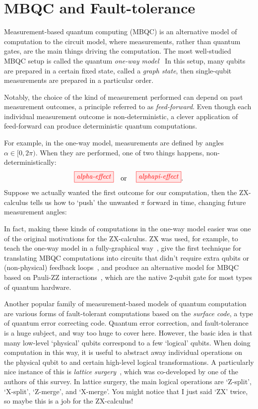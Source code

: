 \documentclass[11pt]{article}
\theoremstyle{definition}
\begin{document}
{\section{MBQC and Fault-tolerance}\label{sec:prac}%
     
Measurement-based quantum computing (MBQC) is an alternative model of computation to the circuit model, where measurements, rather than quantum gates, are the main things driving the computation. The most well-studied MBQC setup is called the quantum \textit{one-way model}~\cite{MBQC2} In this setup, many qubits are prepared in a certain fixed state, called a \textit{graph state}, then single-qubit measurements are prepared in a particular order.

Notably, the choice of the kind of measurement performed can depend on past measurement outcomes, a principle referred to as \textit{feed-forward}. Even though each individual measurement outcome is non-deterministic, a clever application of feed-forward can produce deterministic quantum computations.

For example, in the one-way model, measurements are defined by angles $\alpha \in [0, 2\pi)$. When they are performed, one of two things happens, non-deterministically:
\[ \tikzfig{alpha-effect} \textrm{\quad or \quad} \tikzfig{alphapi-effect}. \]
Suppose we actually wanted the first outcome for our computation, then the ZX-calculus tells us how to `push' the unwanted $\pi$ forward in time, changing future measurement angles:

In fact, making these kinds of computations in the one-way model easier was one of the original motivations for the ZX-calculus. ZX was used, for example, to teach the one-way model in a fully-graphical way~\cite{CKbook}, give the first technique for translating MBQC computations into circuits that didn't require extra qubits or (non-physical) feedback loops~\cite{DP2}, and produce an alternative model for MBQC based on Pauli-ZZ interactions~\cite{Kissinger2019universalmbqc}, which are the native 2-qubit gate for most types of quantum hardware.

Another popular family of measurement-based models of quantum computation are various forms of fault-tolerant computations based on the \textit{surface code}, a type of quantum error correcting code. Quantum error correction, and fault-tolerance is a huge subject, and way too huge to cover here. However, the basic idea is that many low-level `physical' qubits correspond to a few `logical' qubits. When doing computation in this way, it is useful to abstract away individual operations on the physical qubit to and certain high-level logical transformations. A particularly nice instance of this is \textit{lattice surgery}~\cite{Horsman2012}, which was co-developed by one of the authors of this survey. In lattice surgery, the main logical operations are `Z-split', `X-split', `Z-merge', and `X-merge'. You might notice that I just said `ZX' twice, so maybe this is a job for the ZX-calculus!

}
\end{document}
